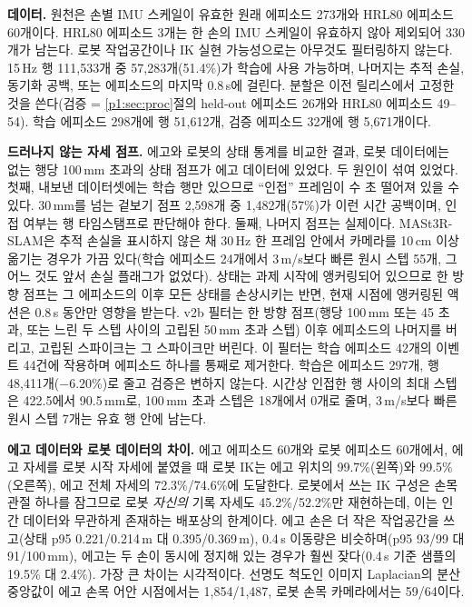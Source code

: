 \documentclass[conference,10pt]{IEEEtran}
\newcommand{\mm}{\,mm\xspace}
\begin{document}
\textbf{데이터.} 원천은 손별 IMU 스케일이 유효한 원래 에피소드 273개와 HRL80 에피소드 60개이다. HRL80 에피소드 3개는 한 손의 IMU
스케일이 유효하지 않아 제외되어 330개가 남는다. 로봇 작업공간이나 IK 실현 가능성으로는 아무것도 필터링하지 않는다. 15\,Hz 행
111{,}533개 중 57{,}283개(51.4\%)가 학습에 사용 가능하며, 나머지는 추적 손실, 동기화 공백, 또는 에피소드의 마지막 0.8\,s에 걸린다.
분할은 이전 릴리스에서 고정한 것을 쓴다(검증 = \ref{p1:sec:proc}절의 held-out 에피소드 26개와 HRL80 에피소드 49--54). 학습 에피소드 298개에
행 51{,}612개, 검증 에피소드 32개에 행 5{,}671개이다.

\textbf{드러나지 않는 자세 점프.} 에고와 로봇의 상태 통계를 비교한 결과, 로봇 데이터에는 없는 행당 100\mm 초과의 상태 점프가 에고
데이터에 있었다. 두 원인이 섞여 있었다. 첫째, 내보낸 데이터셋에는 학습 행만 있으므로 ``인접'' 프레임이 수 초 떨어져 있을 수 있다.
30\mm{}를 넘는 겉보기 점프 2{,}598개 중 1{,}482개(57\%)가 이런 시간 공백이며, 인접 여부는 행 타임스탬프로 판단해야 한다. 둘째, 나머지
점프는 실제이다. MASt3R-SLAM은 추적 손실을 표시하지 않은 채 30\,Hz 한 프레임 안에서 카메라를 10\,cm 이상 옮기는 경우가 가끔 있다(학습
에피소드 24개에서 3\,m/s보다 빠른 원시 스텝 55개, 그 어느 것도 앞서 손실 플래그가 없었다). 상태는 과제 시작에 앵커링되어 있으므로 한
방향 점프는 그 에피소드의 이후 모든 상태를 손상시키는 반면, 현재 시점에 앵커링된 액션은 0.8\,s 동안만 영향을 받는다. v2b 필터는 한 방향
점프(행당 100\mm 또는 45\textdegree{} 초과, 또는 느린 두 스텝 사이의 고립된 50\mm 초과 스텝) 이후 에피소드의 나머지를 버리고, 고립된
스파이크는 그 스파이크만 버린다. 이 필터는 학습 에피소드 42개의 이벤트 44건에 작용하며 에피소드 하나를 통째로 제거한다. 학습은 에피소드
297개, 행 48{,}411개($-6.20$\%)로 줄고 검증은 변하지 않는다. 시간상 인접한 행 사이의 최대 스텝은 422.5에서 90.5\mm{}로, 100\mm 초과
스텝은 18개에서 0개로 줄며, 3\,m/s보다 빠른 원시 스텝 7개는 유효 행 안에 남는다.

\textbf{에고 데이터와 로봇 데이터의 차이.} 에고 에피소드 60개와 로봇 에피소드 60개에서, 에고 자세를 로봇 시작 자세에 붙였을 때 로봇
IK는 에고 위치의 99.7\%(왼쪽)와 99.5\%(오른쪽), 에고 전체 자세의 72.3\%/74.6\%에 도달한다. 로봇에서 쓰는 IK 구성은 손목 관절 하나를
잠그므로 로봇 \emph{자신의} 기록 자세도 45.2\%/52.2\%만 재현하는데, 이는 인간 데이터와 무관하게 존재하는 배포상의 한계이다. 에고 손은
더 작은 작업공간을 쓰고(상태 p95 0.221/0.214\,m 대 0.395/0.369\,m), 0.4\,s 이동량은 비슷하며(p95 93/99 대 91/100\mm), 에고는 두 손이
동시에 정지해 있는 경우가 훨씬 잦다(0.4\,s 기준 샘플의 19.5\% 대 2.4\%). 가장 큰 차이는 시각적이다. 선명도 척도인 이미지 Laplacian의
분산 중앙값이 에고 손목 어안 시점에서는 1{,}854/1{,}487, 로봇 손목 카메라에서는 59/64이다.
\end{document}

